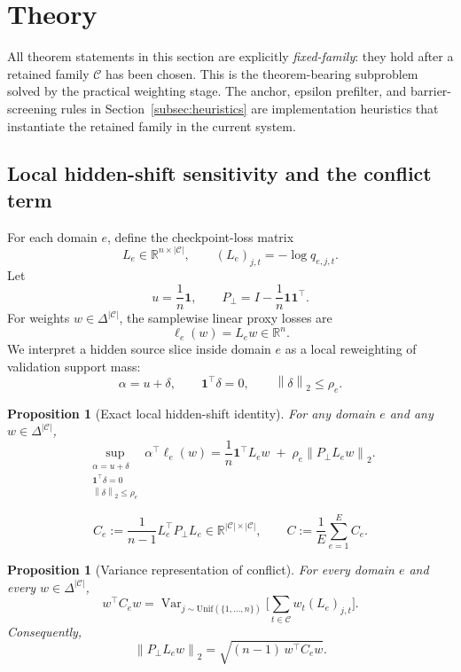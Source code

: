 \documentclass{article}
\newtheorem{proposition}[theorem]{Proposition}
\theoremstyle{definition}
\newcommand{\RR}{\mathbb{R}}
\newcommand{\cC}{\mathcal{C}}
\newcommand{\one}{\mathbf{1}}
\newcommand{\simplex}{\Delta}
\newcommand{\norm}[1]{\left\lVert #1 \right\rVert}
\begin{document}
\section{Theory}
\label{sec:theory}

All theorem statements in this section are explicitly \emph{fixed-family}: they hold after a retained family \(\cC\) has been chosen. This is the theorem-bearing subproblem solved by the practical weighting stage. The anchor, epsilon prefilter, and barrier-screening rules in Section~\ref{subsec:heuristics} are implementation heuristics that instantiate the retained family in the current system.

\subsection{Local hidden-shift sensitivity and the conflict term}

For each domain \(e\), define the checkpoint-loss matrix
\[
L_e \in \RR^{n\times |\cC|},
\qquad
(L_e)_{j,t} = -\log q_{e,j,t}.
\]
Let
\[
u = \frac{1}{n}\one,
\qquad
P_\perp = I - \frac{1}{n}\one\one^\top.
\]
For weights \(w\in\simplex^{|\cC|}\), the samplewise linear proxy losses are
\[
\ell_e(w)=L_e w \in \RR^n.
\]
We interpret a hidden source slice inside domain \(e\) as a local reweighting of validation support mass:
\[
\alpha = u + \delta,
\qquad
\one^\top \delta = 0,
\qquad
\norm{\delta}_2 \le \rho_e.
\]

\begin{proposition}[Exact local hidden-shift identity]
\label{prop:hidden_shift}
For any domain \(e\) and any \(w\in\simplex^{|\cC|}\),
\begin{equation}
\sup_{\substack{\alpha=u+\delta\\ \one^\top\delta=0\\ \norm{\delta}_2\le \rho_e}}
\alpha^\top \ell_e(w)
=
\frac{1}{n}\one^\top L_e w
\;+\;
\rho_e \norm{P_\perp L_e w}_2.
\label{eq:exact_hidden_shift}
\end{equation}
\end{proposition}

\begin{equation}
C_e
:=
\frac{1}{n-1}L_e^\top P_\perp L_e
\in
\RR^{|\cC|\times |\cC|},
\qquad
C := \frac{1}{E}\sum_{e=1}^{E} C_e.
\label{eq:aggregate_conflict}
\end{equation}

\begin{proposition}[Variance representation of conflict]
\label{prop:variance_representation}
For every domain \(e\) and every \(w\in \simplex^{|\cC|}\),
\begin{equation}
w^\top C_e w
=
\operatorname{Var}_{j\sim \mathrm{Unif}(\{1,\dots,n\})}
\Big[
\sum_{t\in\cC} w_t (L_e)_{j,t}
\Big].
\label{eq:variance_representation}
\end{equation}
Consequently,
\begin{equation}
\norm{P_\perp L_e w}_2
=
\sqrt{(n-1)\,w^\top C_e w}.
\label{eq:centered_norm_covariance}
\end{equation}
\end{proposition}
\end{document}
